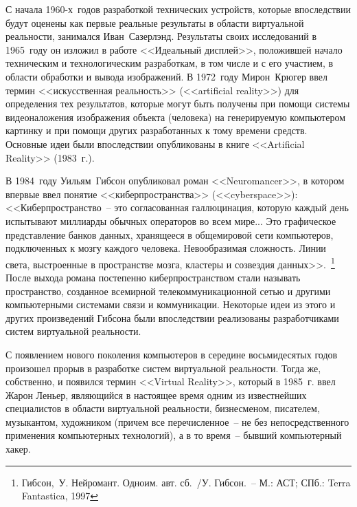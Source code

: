   С начала 1960-х~годов разработкой технических устройств, которые впоследствии
  будут оценены как первые реальные результаты в области виртуальной
  реальности, занимался Иван~Сазерлэнд. Результаты своих исследований в
  1965~году он изложил в работе <<Идеальный дисплей>>, положившей начало
  техническим и технологическим разработкам, в том числе и с его участием, в
  области обработки и вывода изображений. В 1972~году Мирон~Крюгер ввел термин
  <<искусственная реальность>> (<<artificial reality>>) для определения тех
  результатов, которые могут быть получены при помощи системы видеоналожения
  изображения объекта (человека) на генерируемую компьютером картинку и при
  помощи других разработанных к тому времени средств. Основные идеи были
  впоследствии опубликованы в книге <<Artificial Reality>> (1983~г.).
  
  В 1984~году Уильям~Гибсон опубликовал роман <<Neuromancer>>, в котором
  впервые ввел понятие <<киберпространства>> (<<cyberspace>>):
  <<Киберпространство~-- это согласованная галлюцинация, которую каждый день
  испытывают миллиарды обычных операторов во всем мире... Это графическое
  представление банков данных, хранящееся в общемировой сети компьютеров,
  подключенных к мозгу каждого человека. Невообразимая сложность. Линии света,
  выстроенные в пространстве мозга, кластеры и созвездия данных>>.~\footnote{
    Гибсон,~У. Нейромант. Одноим. авт. сб.~/У. Гибсон.~-- М.: АСТ;
    СПб.: Terra Fantastica, 1997}
  После выхода романа постепенно киберпространством стали называть
  пространство, созданное всемирной телекоммуникационной сетью и другими
  компьютерными системами связи и коммуникации. Некоторые идеи из этого и
  других произведений Гибсона были впоследствии реализованы разработчиками
  систем виртуальной реальности.
  
  С появлением нового поколения компьютеров в середине восьмидесятых годов
  произошел прорыв в разработке систем виртуальной реальности. Тогда же,
  собственно, и появился термин <<Virtual Reality>>, который в 1985~г. ввел
  Жарон Леньер, являющийся в настоящее время одним из известнейших специалистов
  в области виртуальной реальности, бизнесменом, писателем, музыкантом,
  художником (причем все перечисленное~-- не без непосредственного применения
  компьютерных технологий), а в то время~-- бывший компьютерный
  хакер.~\cite{Cohrsuntsev}
  
